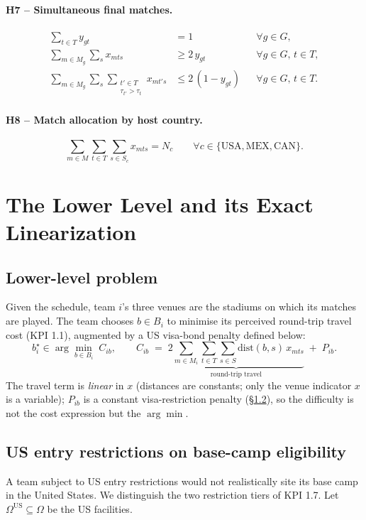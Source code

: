 \documentclass[12pt, letterpaper]{article}
\begin{document}
\paragraph{H7 -- Simultaneous final matches.}
\begin{align}
\sum_{t\in T} y_{gt}&=1 &&\forall g\in G,\\
\sum_{m\in M_g}\sum_{s} x_{mts}&\ge 2\,y_{gt} &&\forall g\in G,\,t\in T,\\
\sum_{m\in M_g}\sum_{s}\sum_{\substack{t'\in T\\ \tau_{t'}>\tau_t}} x_{mt's}
  &\le 2\,(1-y_{gt}) &&\forall g\in G,\,t\in T.
\end{align}

\paragraph{H8 -- Match allocation by host country.}
\begin{equation}
\sum_{m\in M}\sum_{t\in T}\sum_{s\in S_c} x_{mts}=N_c
  \qquad\forall c\in\{\mathrm{USA,MEX,CAN}\}.
\end{equation}

\section{The Lower Level and its Exact Linearization}
\label{sec:lower}

\subsection{Lower-level problem}
Given the schedule, team $i$'s three venues are the stadiums on which its
matches are played. The team chooses $b\in B_i$ to minimise its perceived
round-trip travel cost (KPI 1.1), augmented by a US visa-bond penalty
defined below:
\begin{equation}
b_i^\star \in \arg\min_{b\in B_i}\;
  C_{ib}, \qquad
  C_{ib}\;=\;\underbrace{2\sum_{m\in M_i}\sum_{t\in T}\sum_{s\in S}
            \mathrm{dist}(b,s)\,x_{mts}}_{\text{round-trip travel}}
            \;+\; P_{ib}.
\label{eq:llcost}
\end{equation}
The travel term is \emph{linear} in $x$ (distances are constants; only
the venue indicator $x$ is a variable); $P_{ib}$ is a constant
visa-restriction penalty (\S\ref{sec:visa}), so the difficulty is not the
cost expression but the $\arg\min$.

\subsection{US entry restrictions on base-camp eligibility}
\label{sec:visa}
A team subject to US entry restrictions would not realistically site its
base camp in the United States. We distinguish the two restriction tiers
of KPI 1.7. Let $\Omega^{\mathrm{US}}\subseteq\Omega$ be the US
facilities.
\end{document}
